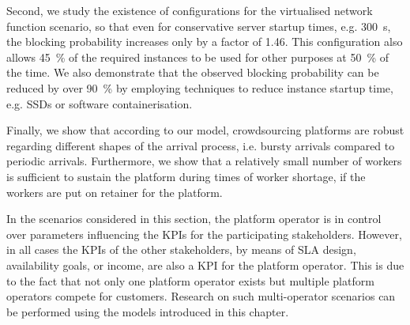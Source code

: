 Second, we study the existence of configurations for the virtualised network function scenario, so that even for conservative server startup times, e.g. \SI{300}{\second}, the blocking probability increases only by a factor of 1.46.
This configuration also allows  \SI{45}{\percent} of the required instances to be used for other purposes at \SI{50}{\percent} of the time. 
We also demonstrate that the observed blocking probability can be reduced by over \SI{90}{\percent} by employing techniques to reduce instance startup time, e.g. \glspl{SSD} or software containerisation.

Finally, we show that according to our model, crowdsourcing platforms are robust regarding different shapes of the arrival process, i.e. bursty arrivals compared to periodic arrivals.
Furthermore, we show that a relatively small number of workers is sufficient to sustain the platform during times of worker shortage, if the workers are put on retainer for the platform.

In the scenarios considered in this section, the platform operator is in control over parameters influencing the \glspl{KPI} for the participating stakeholders.
However, in all cases the \glspl{KPI} of the other stakeholders, by means of \gls{SLA} design, availability goals, or income, are also a \gls{KPI} for the platform operator.
This is due to the fact that not only one platform operator exists but multiple platform operators compete for customers.
Research on such multi-operator scenarios can be performed using the models introduced in this chapter.